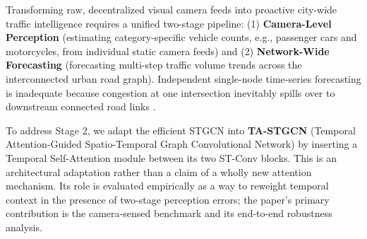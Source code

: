 \documentclass[a4paper,fleqn]{cas-sc}
\begin{document}
Transforming raw, decentralized visual camera feeds into proactive city-wide traffic intelligence requires a unified two-stage pipeline: (1) \textbf{Camera-Level Perception} (estimating category-specific vehicle counts, e.g., passenger cars and motorcycles, from individual static camera feeds) and (2) \textbf{Network-Wide Forecasting} (forecasting multi-step traffic volume trends across the interconnected urban road graph). Independent single-node time-series forecasting is inadequate because congestion at one intersection inevitably spills over to downstream connected road links \cite{ctm}.

To address Stage 2, we adapt the efficient STGCN \cite{stgcn} into \textbf{TA-STGCN} (Temporal Attention-Guided Spatio-Temporal Graph Convolutional Network) by inserting a Temporal Self-Attention module \cite{attention} between its two ST-Conv blocks. This is an architectural adaptation rather than a claim of a wholly new attention mechanism. Its role is evaluated empirically as a way to reweight temporal context in the presence of two-stage perception errors; the paper's primary contribution is the camera-sensed benchmark and its end-to-end robustness analysis.
\end{document}
